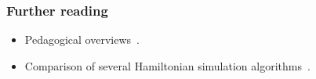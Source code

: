 \begin{refsection}
\subsubsection*{Further reading}

\begin{itemize}
    \item Pedagogical overviews~\cite{martyn2021GrandUnificationQAlgs,lin2022LectureNotes}.
    \item Comparison of several Hamiltonian simulation algorithms~\cite{childs2018towardsFirstQSimSpeedup}.
\end{itemize}






\printbibliography[heading=secbib,segment=\therefsegment]
\end{refsection}
